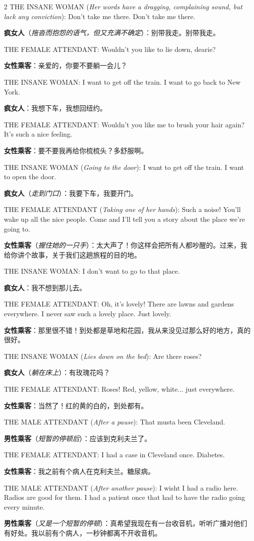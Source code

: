 \documentclass[lang=cn,newtx,10pt,scheme=chinese]{elegantbook}
\newcommand{\pair}[2]{%
\switchcolumn* #2\par
\switchcolumn  #1\par
}
\begin{document}
\begin{paracol}{2}
\pair{
    \textbf{疯女人}（\textit{拖沓而抱怨的语气，但又充满不确定}）：别带我走。别带我走。
}{
    THE INSANE WOMAN (\textit{Her words have a dragging, complaining sound, but lack any conviction}): Don't take me there. Don't take me there.
}

\pair{
    \textbf{女性乘客}：亲爱的，你要不要躺一会儿？
}{
    THE FEMALE ATTENDANT: Wouldn't you like to lie down, dearie?
}

\pair{
    \textbf{疯女人}：我想下车，我想回纽约。
}{
    THE INSANE WOMAN: I want to get off the train. I want to go back to New York.
}

\pair{
    \textbf{女性乘客}：要不要我再给你梳梳头？多舒服啊。
}{
    THE FEMALE ATTENDANT: Wouldn't you like me to brush your hair again? It's such a nice feeling.
}

\pair{
    \textbf{疯女人}（\textit{走到门口}）：我要下车，我要开门。
}{
    THE INSANE WOMAN (\textit{Going to the door}): I want to get off the train. I want to open the door.
}

\pair{
    \textbf{女性乘客}（\textit{握住她的一只手}）：太大声了！你这样会把所有人都吵醒的。过来，我给你讲个故事，关于我们这趟旅程的目的地。
}{
    THE FEMALE ATTENDANT (\textit{Taking one of her hands}): Such a noise! You'll wake up all the nice people. Come and I'll tell you a story about the place we're going to.
}

\pair{
    \textbf{疯女人}：我不想到那儿去。
}{
    THE INSANE WOMAN: I don't want to go to that place.
}

\pair{
    \textbf{女性乘客}：那里很不错！到处都是草地和花园，我从来没见过那么好的地方，真的很好。
}{
    THE FEMALE ATTENDANT: Oh, it's lovely! There are lawns and gardens everywhere. I never saw such a lovely place. Just lovely.
}

\pair{
    \textbf{疯女人}（\textit{躺在床上}）：有玫瑰花吗？
}{
    THE INSANE WOMAN (\textit{Lies down on the bed}): Are there roses?
}

\pair{
    \textbf{女性乘客}：当然了！红的黄的白的，到处都有。
}{
    THE FEMALE ATTENDANT: Roses! Red, yellow, white... just everywhere.
}

\pair{
    \textbf{男性乘客}（\textit{短暂的停顿后}）：应该到克利夫兰了。
}{
    THE MALE ATTENDANT (\textit{After a pause}): That musta been Cleveland.
}

\pair{
    \textbf{女性乘客}：我之前有个病人在克利夫兰。糖尿病。
}{
    THE FEMALE ATTENDANT: I had a case in Cleveland once. Diabetes.
}

\pair{
    \textbf{男性乘客}（\textit{又是一个短暂的停顿}）：真希望我现在有一台收音机，听听广播对他们有好处。我以前有个病人，一秒钟都离不开收音机。
}{
    THE MALE ATTENDANT (\textit{After another pause}): I wisht I had a radio here. Radios are good for them. I had a patient once that had to have the radio going every minute.
}


\end{paracol}
\end{document}
